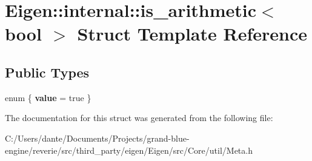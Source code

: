 \hypertarget{struct_eigen_1_1internal_1_1is__arithmetic_3_01bool_01_4}{}\section{Eigen\+::internal\+::is\+\_\+arithmetic$<$ bool $>$ Struct Template Reference}
\label{struct_eigen_1_1internal_1_1is__arithmetic_3_01bool_01_4}
\subsection*{Public Types}
\begin{DoxyCompactItemize}
\item 
\mbox{\label{struct_eigen_1_1internal_1_1is__arithmetic_3_01bool_01_4_a47a5416017a2e6735099b096692aa14e}} 
enum \{ {\bfseries value} = true
 \}
\end{DoxyCompactItemize}


The documentation for this struct was generated from the following file\+:\begin{DoxyCompactItemize}
\item 
C\+:/\+Users/dante/\+Documents/\+Projects/grand-\/blue-\/engine/reverie/src/third\+\_\+party/eigen/\+Eigen/src/\+Core/util/Meta.\+h\end{DoxyCompactItemize}
